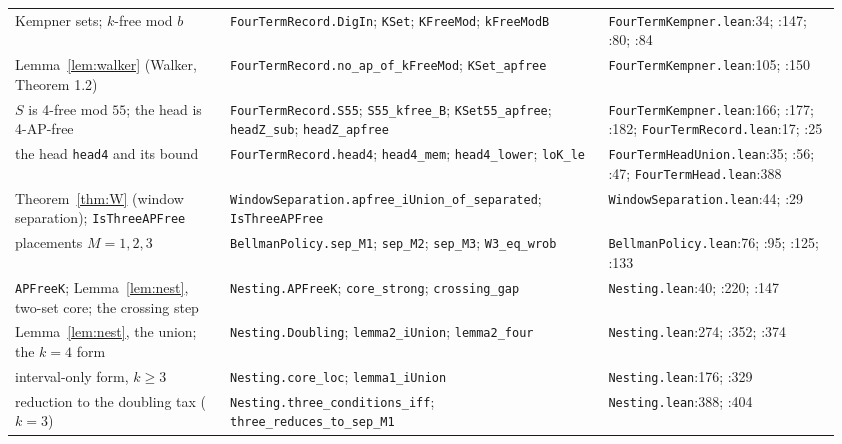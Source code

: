 \documentclass[11pt,a4paper]{article}
\theoremstyle{definition}
\theoremstyle{remark}
\newcommand{\code}[1]{\texttt{#1}}
\begin{document}
\begin{small}
\begin{longtable}{@{}>{\raggedright\arraybackslash}p{0.25\linewidth}>{\raggedright\arraybackslash}p{0.44\linewidth}>{\raggedright\arraybackslash}p{0.27\linewidth}@{}}
Kempner sets; $k$-free mod $b$ & \code{FourTermRecord.\allowbreak{}DigIn}; \code{KSet}; \code{KFreeMod}; \code{kFreeModB} & \code{FourTermKempner.\allowbreak{}lean}:34; :147; :80; :84 \\
Lemma~\ref{lem:walker} (Walker, Theorem 1.2) & \code{FourTermRecord.\allowbreak{}no\_\allowbreak{}ap\_\allowbreak{}of\_\allowbreak{}kFreeMod}; \code{KSet\_\allowbreak{}apfree} & \code{FourTermKempner.\allowbreak{}lean}:105; :150 \\
$S$ is 4-free mod $55$; the head is 4-AP-free & \code{FourTermRecord.\allowbreak{}S55}; \code{S55\_\allowbreak{}kfree\_\allowbreak{}B}; \code{KSet55\_\allowbreak{}apfree}; \code{headZ\_\allowbreak{}sub}; \code{headZ\_\allowbreak{}apfree} & \code{FourTermKempner.\allowbreak{}lean}:166; :177; :182; \code{FourTermRecord.\allowbreak{}lean}:17; :25 \\
the head \code{head4} and its bound & \code{FourTermRecord.\allowbreak{}head4}; \code{head4\_\allowbreak{}mem}; \code{head4\_\allowbreak{}lower}; \code{loK\_\allowbreak{}le} & \code{FourTermHeadUnion.\allowbreak{}lean}:35; :56; :47; \code{FourTermHead.\allowbreak{}lean}:388 \\
Theorem~\ref{thm:W} (window separation); \code{IsThreeAPFree} & \code{WindowSeparation.\allowbreak{}apfree\_\allowbreak{}iUnion\_\allowbreak{}of\_\allowbreak{}separated}; \code{IsThreeAPFree} & \code{WindowSeparation.\allowbreak{}lean}:44; :29 \\
placements $M=1,2,3$ & \code{BellmanPolicy.\allowbreak{}sep\_\allowbreak{}M1}; \code{sep\_\allowbreak{}M2}; \code{sep\_\allowbreak{}M3}; \code{W3\_\allowbreak{}eq\_\allowbreak{}wrob} & \code{BellmanPolicy.\allowbreak{}lean}:76; :95; :125; :133 \\
\code{APFreeK}; Lemma~\ref{lem:nest}, two-set core; the crossing step & \code{Nesting.\allowbreak{}APFreeK}; \code{core\_\allowbreak{}strong}; \code{crossing\_\allowbreak{}gap} & \code{Nesting.\allowbreak{}lean}:40; :220; :147 \\
Lemma~\ref{lem:nest}, the union; the $k=4$ form & \code{Nesting.\allowbreak{}Doubling}; \code{lemma2\_\allowbreak{}iUnion}; \code{lemma2\_\allowbreak{}four} & \code{Nesting.\allowbreak{}lean}:274; :352; :374 \\
interval-only form, $k \ge 3$ & \code{Nesting.\allowbreak{}core\_\allowbreak{}loc}; \code{lemma1\_\allowbreak{}iUnion} & \code{Nesting.\allowbreak{}lean}:176; :329 \\
reduction to the doubling tax ($k=3$) & \code{Nesting.\allowbreak{}three\_\allowbreak{}conditions\_\allowbreak{}iff}; \code{three\_\allowbreak{}reduces\_\allowbreak{}to\_\allowbreak{}sep\_\allowbreak{}M1} & \code{Nesting.\allowbreak{}lean}:388; :404 \\

\end{longtable}
\end{small}
\end{document}
